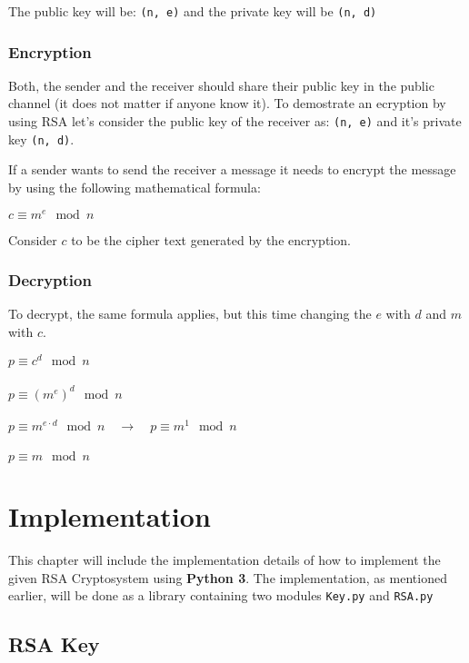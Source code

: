 \documentclass[usenames,dvipsnames,12pt]{report}
\begin{document}
The public key will be: \texttt{(n, e)} and the private key will be \texttt{(n, d)}

\subsection{Encryption}

Both, the sender and the receiver should share their public key in the public channel (it does not matter if anyone know it).
To demostrate an ecryption by using RSA let's consider the public key of the receiver as: \texttt{(n, e)} and it's
private key \texttt{(n, d)}.

If a sender wants to send the receiver a message it needs to encrypt the message by using the following mathematical formula:

\begin{center}
    $c \equiv m^e \mod n$
\end{center}

Consider $c$ to be the cipher text generated by the encryption.

\subsection{Decryption}

To decrypt, the same formula applies, but this time changing the $e$ with $d$ and $m$ with $c$.

\begin{center}
    $p \equiv c^d \mod n$ \\~\\
    $p \equiv (m^e)^d \mod n$ \\~\\
    $p \equiv m^{e \cdot d} \mod n \quad \rightarrow \quad p \equiv m^1 \mod n$ \\~\\
    $\boxed{p \equiv m \mod n}$
\end{center}

\chapter{Implementation}

This chapter will include the implementation details of how to implement the given RSA Cryptosystem
using \textbf{Python 3}. The implementation, as mentioned earlier, will be done as a library containing
two modules \texttt{Key.py} and \texttt{RSA.py}

\section{RSA Key}
\end{document}
